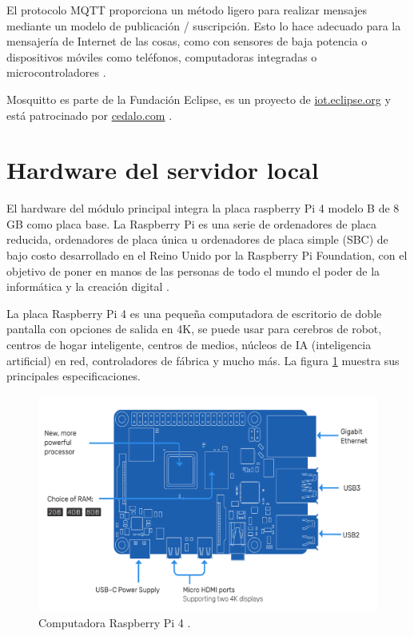 El protocolo MQTT proporciona un método ligero para realizar mensajes mediante un modelo de publicación / suscripción. Esto lo hace adecuado para la mensajería de Internet de las cosas, como con sensores de baja potencia o dispositivos móviles como teléfonos, computadoras integradas o microcontroladores \citep{WEBSITE:5}.

Mosquitto es parte de la Fundación Eclipse, es un proyecto de \url{iot.eclipse.org} y está patrocinado por \url{cedalo.com} \citep{WEBSITE:5}. 

\section{Hardware del servidor local} 

El hardware del módulo principal integra la placa raspberry Pi 4 modelo B de 8 GB como placa base. La Raspberry Pi es una serie de ordenadores de placa reducida, ordenadores de placa única u ordenadores de placa simple (SBC) de bajo costo desarrollado en el Reino Unido por la Raspberry Pi Foundation, con el objetivo de poner en manos de las personas de todo el mundo el poder de la informática y la creación digital \citep{WEBSITE:6}.

La placa Raspberry Pi 4 es una pequeña computadora de escritorio de doble pantalla con opciones de salida en 4K, se puede usar para cerebros de robot, centros de hogar inteligente, centros de medios, núcleos de IA (inteligencia artificial) en red, controladores de fábrica y mucho más. La figura \ref{fig:rpi4} muestra sus principales especificaciones.

\vspace{0.5cm}

\begin{figure}[htbp]
	\centering
	\includegraphics[width=1.0\textwidth]{./Figures/rpi4.png}
	\caption{Computadora Raspberry Pi 4 \protect\footnotemark. \citep{WEBSITE:7}}

	\label{fig:rpi4}
\end{figure}

